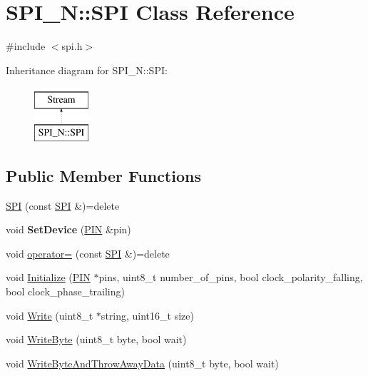 \hypertarget{class_s_p_i___n_1_1_s_p_i}{}\section{S\+P\+I\+\_\+N\+:\+:S\+PI Class Reference}
\label{class_s_p_i___n_1_1_s_p_i}


{\ttfamily \#include $<$spi.\+h$>$}

Inheritance diagram for S\+P\+I\+\_\+N\+:\+:S\+PI\+:\begin{figure}[H]
\begin{center}
\leavevmode
\includegraphics[height=2.000000cm]{class_s_p_i___n_1_1_s_p_i}
\end{center}
\end{figure}
\subsection*{Public Member Functions}
\begin{DoxyCompactItemize}
\item 
\hyperlink{class_s_p_i___n_1_1_s_p_i_ab486ba0f0d9ec880520e568762cc6c7d}{S\+PI} (const \hyperlink{class_s_p_i___n_1_1_s_p_i}{S\+PI} \&)=delete
\item 
void {\bfseries Set\+Device} (\hyperlink{struct_s_p_i___n_1_1_p_i_n}{P\+IN} \&pin)\hypertarget{class_s_p_i___n_1_1_s_p_i_ad04a79c8e9139545a96af71245ce8d18}{}\label{class_s_p_i___n_1_1_s_p_i_ad04a79c8e9139545a96af71245ce8d18}

\item 
void \hyperlink{class_s_p_i___n_1_1_s_p_i_aabc66612d396c2b70e5cbdba405dbfe5}{operator=} (const \hyperlink{class_s_p_i___n_1_1_s_p_i}{S\+PI} \&)=delete
\item 
void \hyperlink{class_s_p_i___n_1_1_s_p_i_ab0517cd53e32d224a0171e6eeb200870}{Initialize} (\hyperlink{struct_s_p_i___n_1_1_p_i_n}{P\+IN} $\ast$pins, uint8\+\_\+t number\+\_\+of\+\_\+pins, bool clock\+\_\+polarity\+\_\+falling, bool clock\+\_\+phase\+\_\+trailing)
\item 
void \hyperlink{class_s_p_i___n_1_1_s_p_i_a3e2e2a7f02ffa5003548a1b9d820ce9a}{Write} (uint8\+\_\+t $\ast$string, uint16\+\_\+t size)
\item 
void \hyperlink{class_s_p_i___n_1_1_s_p_i_a542dc8e88203de7040ce9926d06b9463}{Write\+Byte} (uint8\+\_\+t byte, bool wait)
\item 
void \hyperlink{class_s_p_i___n_1_1_s_p_i_a05bcca2e033422b2e6ad570320d03fcb}{Write\+Byte\+And\+Throw\+Away\+Data} (uint8\+\_\+t byte, bool wait)
\end{DoxyCompactItemize}
